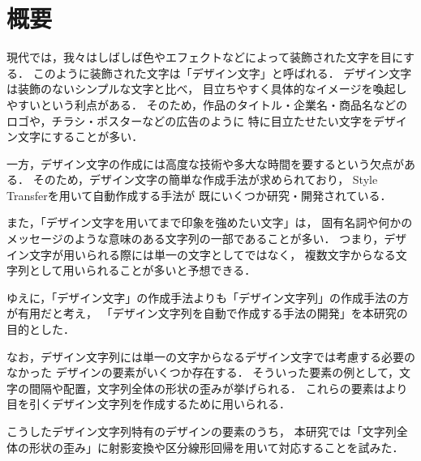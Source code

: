 \documentclass[\homedir/main.tex]{subfiles}
\begin{document}
\chapter*{概要}\label{chap:abstract}%
現代では，我々はしばしば色やエフェクトなどによって装飾された文字を目にする．
このように装飾された文字は「デザイン文字」と呼ばれる．
デザイン文字は装飾のないシンプルな文字と比べ，
目立ちやすく具体的なイメージを喚起しやすいという利点がある．
そのため，作品のタイトル・企業名・商品名などのロゴや，チラシ・ポスターなどの広告のように
特に目立たせたい文字をデザイン文字にすることが多い．

一方，デザイン文字の作成には高度な技術や多大な時間を要するという欠点がある．
そのため，デザイン文字の簡単な作成手法が求められており，
Style Transferを用いて自動作成する手法が
既にいくつか研究・開発されている．

また，「デザイン文字を用いてまで印象を強めたい文字」は，
固有名詞や何かのメッセージのような意味のある文字列の一部であることが多い．
つまり，デザイン文字が用いられる際には単一の文字としてではなく，
複数文字からなる文字列として用いられることが多いと予想できる．

ゆえに，「デザイン文字」の作成手法よりも「デザイン文字列」の作成手法の方が有用だと考え，
「デザイン文字列を自動で作成する手法の開発」を本研究の目的とした．

なお，デザイン文字列には単一の文字からなるデザイン文字では考慮する必要のなかった
デザインの要素がいくつか存在する．
そういった要素の例として，文字の間隔や配置，文字列全体の形状の歪みが挙げられる．
これらの要素はより目を引くデザイン文字列を作成するために用いられる．

こうしたデザイン文字列特有のデザインの要素のうち，
本研究では「文字列全体の形状の歪み」に射影変換や区分線形回帰を用いて対応することを試みた．
\end{document}
